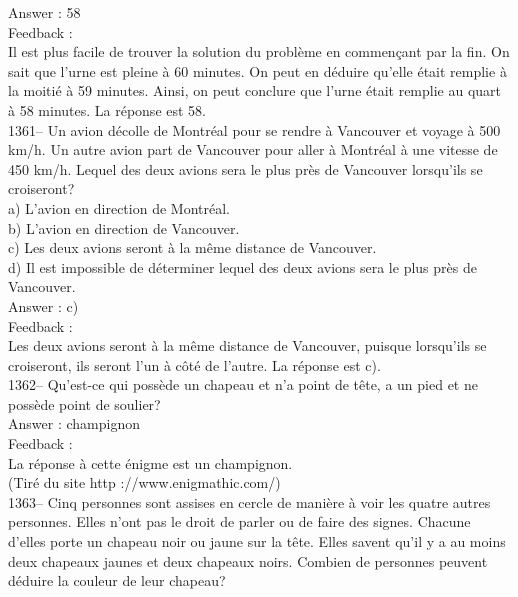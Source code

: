 ﻿\documentclass[letterpaper, 12pt]{article}
\begin{document}
Answer : 58\\

Feedback : \\
Il est plus facile de trouver la solution du probl\`eme en commen\c cant par
la fin.  On sait que l'urne est pleine \`a 60 minutes.  On peut en d\'eduire
qu'elle \'etait remplie \`a la moiti\'e \`a 59 minutes.  Ainsi, on peut
conclure que l'urne \'etait remplie au quart \`a 58 minutes.  La r\'eponse
est 58.\\

1361-- Un avion d\'ecolle de Montr\'eal pour se rendre \`a Vancouver et
voyage \`a 500 km/h.  Un autre avion part de Vancouver pour aller \`a
Montr\'eal \`a une vitesse de 450 km/h.  Lequel des deux avions sera le plus
pr\`es de Vancouver lorsqu'ils se croiseront?\\
a) L'avion en direction de Montr\'eal.\\
b) L'avion en direction de Vancouver.\\
c) Les deux avions seront \`a la m\^eme distance de Vancouver.\\
d) Il est impossible de d\'eterminer lequel des deux avions sera le plus
pr\`es de Vancouver.\\

Answer : c)\\

Feedback : \\
Les deux avions seront \`a la m\^eme distance de Vancouver, puisque
lorsqu'ils se croiseront, ils seront l'un \`a c\^ot\'e de l'autre.  La
r\'eponse est c).\\



1362-- Qu'est-ce qui poss\`ede un chapeau et n'a point de t\^ete, a un pied
et ne poss\`ede point de soulier?\\

Answer : champignon\\

Feedback : \\
La r\'eponse \`a cette \'enigme est un champignon.\\
(Tir\'e du site http ://www.enigmathic.com/)\\





1363-- Cinq personnes sont assises en cercle de mani\`ere \`a voir les
quatre autres personnes.  Elles n'ont pas le droit de parler ou de faire des
signes.  Chacune d'elles porte un chapeau noir ou jaune sur la t\^ete.
Elles savent qu'il y a au moins deux chapeaux jaunes et deux chapeaux noirs.
  Combien de personnes peuvent d\'eduire la couleur de leur chapeau?\\
\end{document}
